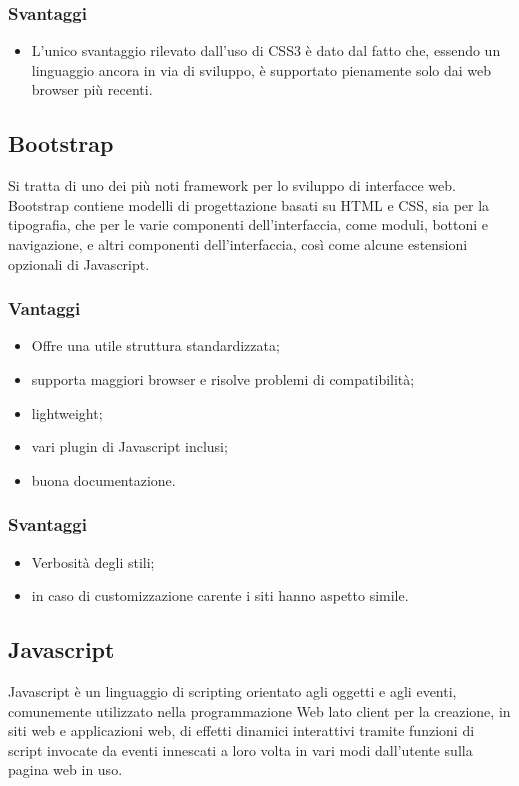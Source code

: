 \documentclass[a4paper, titlepage]{article}
\begin{document}
\subsubsection{Svantaggi}

\begin{itemize}
	\item L’unico svantaggio rilevato dall’uso di CSS3 è dato dal fatto che, essendo un linguaggio ancora in via di sviluppo, è supportato pienamente solo dai web browser più recenti.
\end{itemize}

\subsection{Bootstrap}
Si tratta di uno dei più noti framework per lo sviluppo di interfacce web. Bootstrap contiene modelli di progettazione basati su HTML e CSS, sia per la tipografia, che per le varie componenti dell'interfaccia, come moduli, bottoni e navigazione, e altri componenti dell'interfaccia, così come alcune estensioni opzionali di Javascript.

\subsubsection{Vantaggi}

\begin{itemize}
	\item Offre una utile struttura standardizzata;
	\item supporta maggiori browser e risolve problemi di compatibilità;
	\item lightweight;
	\item vari plugin di Javascript inclusi;
	\item buona documentazione.
\end{itemize}

\subsubsection{Svantaggi}

\begin{itemize}
	\item Verbosità degli stili;
	\item in caso di customizzazione carente i siti hanno aspetto simile.
\end{itemize}

\subsection{Javascript}
Javascript è un linguaggio di scripting orientato agli oggetti e agli eventi, comunemente utilizzato nella programmazione Web lato client per la creazione, in siti web e applicazioni web, di effetti dinamici interattivi tramite funzioni di script invocate da eventi innescati a loro volta in vari modi dall'utente sulla pagina web in uso.
\end{document}
